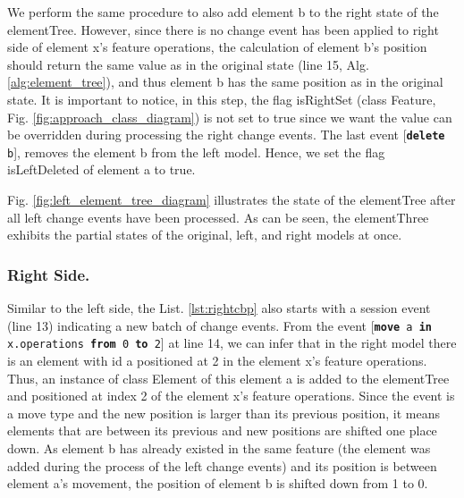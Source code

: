\documentclass{jot}
\begin{document}
We perform the same procedure to also add element \textsf{b} to the right state of the \textsf{elementTree}. However, since there is no change event has been applied to right side of element \textsf{x}'s feature \textsf{operations}, the calculation of element \textsf{b}'s position should return the same value as in the original state (line 15, Alg. \ref{alg:element_tree}), and thus element \textsf{b} has the same position as in the original state. It is important to notice, in this step, the flag \textsf{isRightSet} (class \textsf{Feature}, Fig. \ref{fig:approach_class_diagram}) is not set to \textsf{true} since we want the value can be overridden during processing the right change events. The last event [\texttt{\small \textbf{delete} b}], removes the element \textsf{b} from the left model. Hence, we set the flag \textsf{isLeftDeleted} of element \textsf{a} to \textsf{true}.

Fig. \ref{fig:left_element_tree_diagram} illustrates the state of the \textsf{elementTree} after all left change events have been processed. As can be seen, the \textsf{elementThree} exhibits the partial states of the original, left, and right models at once. 

\vspace{-10pt}
\subsubsection{Right Side.}\label{sec:right_side}  Similar to the left side, the List. \ref{lst:rightcbp} also starts with a \textsf{session} event (line 13) indicating a new batch of change events. From the event [\texttt{\small \textbf{move} a \textbf{in} x.operations \textbf{from} 0 \textbf{to} 2}] at line 14, we can infer that in the right model there is an element with id \textsf{a} positioned at 2 in the element \textsf{x}'s feature \textsf{operations}. Thus, an instance of class \textsf{Element} of this element \textsf{a} is added to the \textsf{elementTree} and positioned at index 2 of the element \textsf{x}'s feature \textsf{operations}. Since the event is a \textsf{move} type and the new position is larger than its previous position, it means elements that are between its previous and new positions are shifted one place down. As element \textsf{b} has already existed in the same feature (the element was added during the process of the left change events) and its position is between element \textsf{a}'s movement, the position of element \textsf{b} is shifted down from 1 to 0. 
\end{document}
